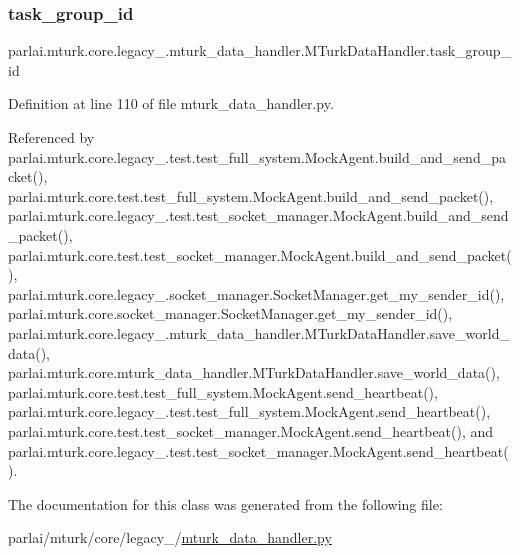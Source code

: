 \subsubsection{\texorpdfstring{task\+\_\+group\+\_\+id}{task\_group\_id}}
{\footnotesize\ttfamily parlai.\+mturk.\+core.\+legacy\+\_.\+mturk\+\_\+data\+\_\+handler.\+M\+Turk\+Data\+Handler.\+task\+\_\+group\+\_\+id}



Definition at line 110 of file mturk\+\_\+data\+\_\+handler.\+py.



Referenced by parlai.\+mturk.\+core.\+legacy\+\_.\+test.\+test\+\_\+full\+\_\+system.\+Mock\+Agent.\+build\+\_\+and\+\_\+send\+\_\+packet(), parlai.\+mturk.\+core.\+test.\+test\+\_\+full\+\_\+system.\+Mock\+Agent.\+build\+\_\+and\+\_\+send\+\_\+packet(), parlai.\+mturk.\+core.\+legacy\+\_.\+test.\+test\+\_\+socket\+\_\+manager.\+Mock\+Agent.\+build\+\_\+and\+\_\+send\+\_\+packet(), parlai.\+mturk.\+core.\+test.\+test\+\_\+socket\+\_\+manager.\+Mock\+Agent.\+build\+\_\+and\+\_\+send\+\_\+packet(), parlai.\+mturk.\+core.\+legacy\+\_.\+socket\+\_\+manager.\+Socket\+Manager.\+get\+\_\+my\+\_\+sender\+\_\+id(), parlai.\+mturk.\+core.\+socket\+\_\+manager.\+Socket\+Manager.\+get\+\_\+my\+\_\+sender\+\_\+id(), parlai.\+mturk.\+core.\+legacy\+\_.\+mturk\+\_\+data\+\_\+handler.\+M\+Turk\+Data\+Handler.\+save\+\_\+world\+\_\+data(), parlai.\+mturk.\+core.\+mturk\+\_\+data\+\_\+handler.\+M\+Turk\+Data\+Handler.\+save\+\_\+world\+\_\+data(), parlai.\+mturk.\+core.\+test.\+test\+\_\+full\+\_\+system.\+Mock\+Agent.\+send\+\_\+heartbeat(), parlai.\+mturk.\+core.\+legacy\+\_.\+test.\+test\+\_\+full\+\_\+system.\+Mock\+Agent.\+send\+\_\+heartbeat(), parlai.\+mturk.\+core.\+test.\+test\+\_\+socket\+\_\+manager.\+Mock\+Agent.\+send\+\_\+heartbeat(), and parlai.\+mturk.\+core.\+legacy\+\_.\+test.\+test\+\_\+socket\+\_\+manager.\+Mock\+Agent.\+send\+\_\+heartbeat().



The documentation for this class was generated from the following file\+:\begin{DoxyCompactItemize}
\item 
parlai/mturk/core/legacy\+\_/\hyperlink{legacy__2018_2mturk__data__handler_8py}{mturk\+\_\+data\+\_\+handler.\+py}\end{DoxyCompactItemize}
